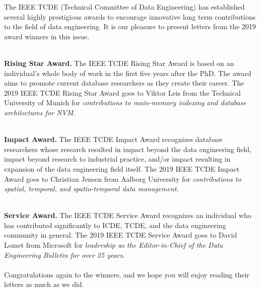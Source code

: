 

%


The IEEE TCDE (Technical Committee of Data Engineering) has established several highly prestigious awards to encourage innovative long term contributions to the field of data engineering. It is our pleasure to present letters from the 2019 award winners in this issue.


\  
\\
{\bf Rising Star Award.} The IEEE TCDE Rising Star Award is based on an individual's whole body of work in the first five years after the PhD. The award aims to promote current database researchers as they create their career. The 2019 IEEE TCDE Rising Star Award goes to Viktor Leis from the Technical University of Munich
for \emph{contributions to main-memory indexing and database architectures for NVM}.

\  
\\
{\bf Impact Award.} The IEEE TCDE Impact Award recognizes database researchers whose research resulted in impact beyond the data engineering field, impact beyond research to industrial practice, and/or impact resulting in expansion of the data engineering field itself. The 2019 IEEE TCDE Impact Award goes to 
Christian Jensen from Aalborg University for \emph{contributions to spatial, temporal, and spatio-temporal data management}.

\  
\\
{\bf Service Award.} The IEEE TCDE Service Award recognizes an individual who has contributed significantly to ICDE, TCDE, and the data engineering community in general. The 2019 IEEE TCDE Service Award goes to David Lomet from Microsoft for 
\emph{leadership as the Editor-in-Chief of the Data Engineering Bulletin for over 25 years}.\\
\indent
\ 
\\
Congratulations again to the winners, and we hope you will enjoy reading their letters as much as we did.


